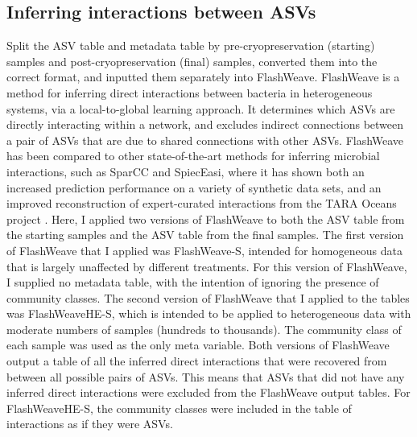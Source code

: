 \documentclass[11pt]{article}
\begin{document}
\subsection{Inferring interactions between ASVs}
Split the ASV table and metadata table by pre-cryopreservation (starting) samples and post-cryopreservation (final) samples, converted them into the correct format, and inputted them separately into FlashWeave. FlashWeave is a method for inferring direct interactions between bacteria in heterogeneous systems, via a local-to-global learning approach. It determines which ASVs are directly interacting within a network, and excludes indirect connections between a pair of ASVs that are due to shared connections with other ASVs. FlashWeave has been compared to other state-of-the-art methods for inferring microbial interactions, such as SparCC and SpiecEasi, where it has shown both an increased prediction performance on a variety of synthetic data sets, and an improved reconstruction of expert-curated interactions from the TARA Oceans project \citep{TACKMANN2019286}. 
Here, I applied two versions of FlashWeave to both the ASV table from the starting samples and the ASV table from the final samples. The first version of FlashWeave that I applied was FlashWeave-S, intended for homogeneous data that is largely unaffected by different treatments. For this version of FlashWeave, I supplied no metadata table, with the intention of ignoring the presence of community classes. The second version of FlashWeave that I applied to the tables was FlashWeaveHE-S, which is intended to be applied to heterogeneous data with moderate numbers of samples (hundreds to thousands). The community class of each sample was used as the only meta variable. 
Both versions of FlashWeave output a table of all the inferred direct interactions that were recovered from between all possible pairs of ASVs. This means that ASVs that did not have any inferred direct interactions were excluded from the FlashWeave output tables. For FlashWeaveHE-S, the community classes were included in the table of interactions as if they were ASVs.
\end{document}

